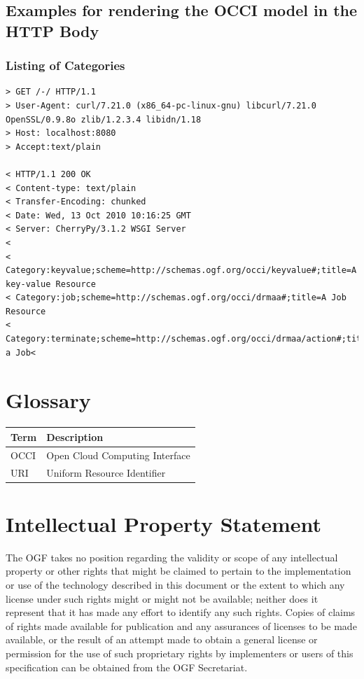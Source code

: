 \documentclass[10pt,a4paper]{article}
\begin{document}
\subsection{Examples for rendering the OCCI model in the HTTP Body}

\subsubsection{Listing of Categories}

\begin{verbatim}
> GET /-/ HTTP/1.1
> User-Agent: curl/7.21.0 (x86_64-pc-linux-gnu) libcurl/7.21.0 OpenSSL/0.9.8o zlib/1.2.3.4 libidn/1.18
> Host: localhost:8080
> Accept:text/plain

< HTTP/1.1 200 OK
< Content-type: text/plain
< Transfer-Encoding: chunked
< Date: Wed, 13 Oct 2010 10:16:25 GMT
< Server: CherryPy/3.1.2 WSGI Server
< 
< Category:keyvalue;scheme=http://schemas.ogf.org/occi/keyvalue#;title=A key-value Resource
< Category:job;scheme=http://schemas.ogf.org/occi/drmaa#;title=A Job Resource
< Category:terminate;scheme=http://schemas.ogf.org/occi/drmaa/action#;title=Terminate a Job< 
\end{verbatim}

\section{Glossary}

\begin{tabular}{l|l}
Term & Description \\
\hline
OCCI & Open Cloud Computing Interface \\
URI & Uniform Resource Identifier \\
\end{tabular}

\section{Intellectual Property Statement}

The OGF takes no position regarding the validity or scope of any intellectual property or other rights that might be claimed to pertain to the implementation or use of the technology described in this document or the extent to which any license under such rights might or might not be available; neither does it represent that it has made any effort to identify any such rights. Copies of claims of rights made available for publication and any assurances of licenses to be made available, or the result of an attempt made to obtain a general license or permission for the use of such proprietary rights by implementers or users of this specification can be obtained from the OGF Secretariat.
\end{document}
